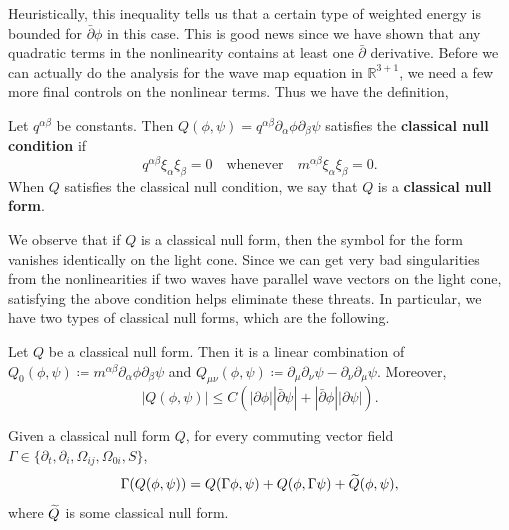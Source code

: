 \documentclass{article}
\begin{document}
Heuristically, this inequality tells us that a certain type of weighted energy is bounded for $\bar{\partial}\phi$ in this case. This is good news since we have shown that any quadratic terms in the nonlinearity contains at least one $\bar{\partial}$ derivative. Before we can actually do the analysis for the wave map equation in $\mathbb{R}^{3 + 1}$, we need a few more final controls on the nonlinear terms. Thus we have the definition, 
\begin{definition}
	Let $q^{\alpha\beta}$ be constants. Then $Q(\phi,\psi) = q^{\alpha\beta}\partial_{\alpha}\phi\partial_{\beta}\psi$ satisfies the \textbf{classical null condition} if 
	\begin{equation*}
		q^{\alpha\beta}\xi_{\alpha}\xi_{\beta} = 0 \quad \text{whenever} \quad m^{\alpha\beta}\xi_{\alpha}\xi_{\beta} = 0. 
	\end{equation*} 
	When $Q$ satisfies the classical null condition, we say that $Q$ is a \textbf{classical null form}. 
\end{definition} 
We observe that if $Q$ is a classical null form, then the symbol for the form vanishes identically on the light cone. Since we can get very bad singularities from the nonlinearities if two waves have parallel wave vectors on the light cone, satisfying the above condition helps eliminate these threats. In particular, we have two types of classical null forms, which are the following. 
\begin{lemma}
	Let $Q$ be a classical null form. Then it is a linear combination of $Q_{0}(\phi,\psi) \coloneqq m^{\alpha\beta}\partial_{\alpha}\phi\partial_{\beta}\psi$ and $Q_{\mu\nu}(\phi,\psi)\coloneqq \partial_{\mu}\partial_{\nu}\psi - \partial_{\nu}\partial_{\mu}\psi$. Moreover, 
	\begin{equation*}
		|Q(\phi,\psi)| \leq C(|\partial \phi||\bar{\partial}\psi| + |\bar{\partial}\phi||\partial \psi|). 
	\end{equation*}
\end{lemma} 
\begin{lemma}
	Given a classical null form $Q$, for every commuting vector field $\Gamma \in \{\partial_{t}, \partial_{i}, \Omega_{ij}, \Omega_{0i}, S\}$, 
	\begin{equation*}
		\Gamma(Q(\phi, \psi)) = Q(\Gamma\phi,\psi) + Q(\phi, \Gamma\psi) + \widetilde{Q}(\phi, \psi), 
	\end{equation*}
	where $\widetilde{Q}$ is some classical null form. 
\end{lemma} 
\end{document}
